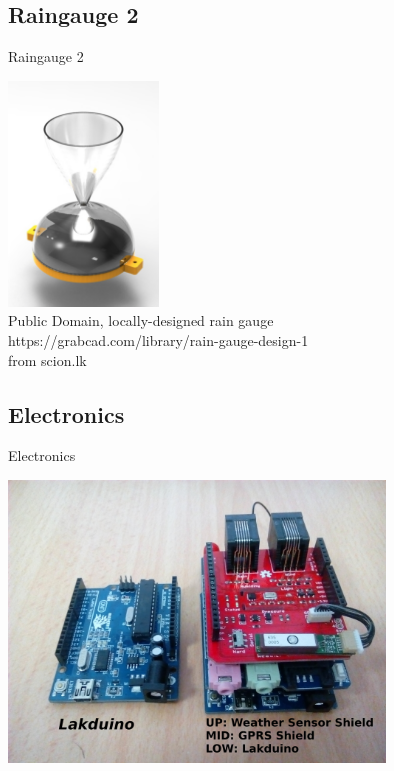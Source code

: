 \documentclass[xcolor=dvipsnames,beamer,unknownkeysallowed]{beamer} %
\begin{document}
\subsection{Raingauge 2}
\begin{frame}[fragile]{Raingauge 2}

\begin{center}
 \includegraphics[width=4cm]{oshw_raingauge}\\
\vspace{5mm}
Public Domain, locally-designed rain gauge\\
https://grabcad.com/library/rain-gauge-design-1\\
from scion.lk
\end{center}
\end{frame}

\subsection{Electronics}
\begin{frame}[fragile]{Electronics}

\begin{center}
 \includegraphics[width=10cm]{MWSv1_annotated}
\end{center}

\end{frame}
\end{document}
